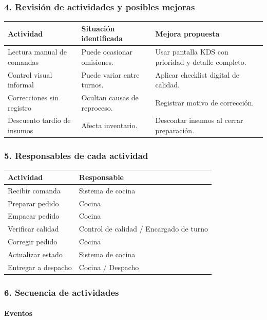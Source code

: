 \documentclass[a4paper,12pt]{article}
\begin{document}
\subsubsection*{4. Revisión de actividades y posibles mejoras}

\begin{longtable}{P{5cm} P{4cm} P{5cm}}
\toprule
\textbf{Actividad} & \textbf{Situación identificada} & \textbf{Mejora propuesta} \\
\midrule
Lectura manual de comandas & Puede ocasionar omisiones. & Usar pantalla KDS con prioridad y detalle completo. \\
Control visual informal & Puede variar entre turnos. & Aplicar checklist digital de calidad. \\
Correcciones sin registro & Ocultan causas de reproceso. & Registrar motivo de corrección. \\
Descuento tardío de insumos & Afecta inventario. & Descontar insumos al cerrar preparación. \\
\bottomrule
\end{longtable}

\subsubsection*{5. Responsables de cada actividad}

\begin{longtable}{P{7cm} P{7cm}}
\toprule
\textbf{Actividad} & \textbf{Responsable} \\
\midrule
Recibir comanda & Sistema de cocina \\
Preparar pedido & Cocina \\
Empacar pedido & Cocina \\
Verificar calidad & Control de calidad / Encargado de turno \\
Corregir pedido & Cocina \\
Actualizar estado & Sistema de cocina \\
Entregar a despacho & Cocina / Despacho \\
\bottomrule
\end{longtable}

\subsubsection*{6. Secuencia de actividades}

\paragraph{Eventos}
\end{document}
